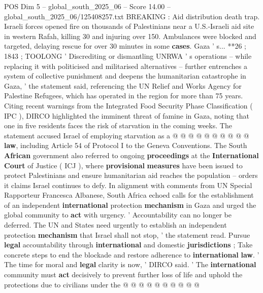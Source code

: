 \begin{textsample}{POS Dim 5 – global\_south\_2025\_06 – Score 14.00 – global\_south\_2025\_06/125408257.txt}
BREAKING : Aid distribution death trap.
Israeli forces opened fire on thousands of Palestinians near a U.S.-Israeli aid site in western Rafah, killing 30 and injuring over 150.
Ambulances were blocked and targeted, delaying rescue for over 30 minutes in some \textbf{cases}.
Gaza ' s... **26 ; 1843 ; TOOLONG ' Discrediting or dismantling UNRWA ' s operations -- while replacing it with politicised and militarised alternatives -- further entrenches a system of collective punishment and deepens the humanitarian catastrophe in Gaza, ' the statement said, referencing the UN Relief and Works Agency for Palestine Refugees, which has operated in the region for more than 75 years.
Citing recent warnings from the Integrated Food Security Phase Classification ( IPC ), DIRCO highlighted the imminent threat of famine in Gaza, noting that one in five residents faces the risk of starvation in the coming weeks.
The statement accused Israel of employing starvation as a @ @ @ @ @ @ @ @ @ @ \textbf{law}, including Article 54 of Protocol I to the Geneva Conventions.
The South \textbf{African} government also referred to ongoing \textbf{proceedings} at the \textbf{International} \textbf{Court} of Justice ( ICJ ), where \textbf{provisional} \textbf{measures} have been issued to protect Palestinians and ensure humanitarian aid reaches the population -- orders it claims Israel continues to defy.
In alignment with comments from UN Special Rapporteur Francesca Albanese, South Africa echoed calls for the establishment of an independent \textbf{international} protection \textbf{mechanism} in Gaza and urged the global community to \textbf{act} with urgency. ' Accountability can no longer be deferred.
The UN and States need urgently to establish an independent protection \textbf{mechanism} that Israel shall not stop, ' the statement read.
Pursue \textbf{legal} accountability through \textbf{international} and domestic \textbf{jurisdictions} ; Take concrete steps to end the blockade and restore adherence to \textbf{international} \textbf{law}. ' The time for moral and \textbf{legal} clarity is now, ' DIRCO said. ' The \textbf{international} community must \textbf{act} decisively to prevent further loss of life and uphold the protections due to civilians under the @ @ @ @ @ @ @ @ @ @

\end{textsample}
